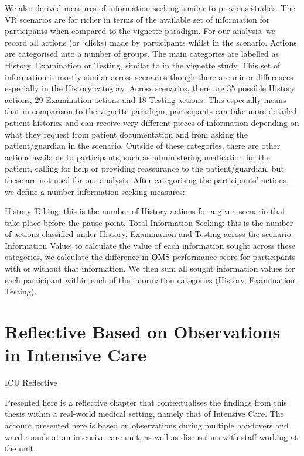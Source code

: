 \documentclass[a4paper, nobind]{templates/ociamthesis}
\begin{document}
We also derived measures of information seeking similar to previous studies. The VR scenarios are far richer in terms of the available set of information for participants when compared to the vignette paradigm. For our analysis, we record all actions (or `clicks) made by participants whilst in the scenario. Actions are categorised into a number of groups. The main categories are labelled as History, Examination or Testing, similar to in the vignette study. This set of information is mostly similar across scenarios though there are minor differences especially in the History category. Across scenarios, there are 35 possible History actions, 29 Examination actions and 18 Testing actions. This especially means that in comparison to the vignette paradigm, participants can take more detailed patient histories and can receive very different pieces of information depending on what they request from patient documentation and from asking the patient/guardian in the scenario. Outside of these categories, there are other actions available to participants, such as administering medication for the patient, calling for help or providing reassurance to the patient/guardian, but these are not used for our analysis. After categorising the participants' actions, we define a number information seeking measures:

History Taking: this is the number of History actions for a given scenario that take place before the pause point.
Total Information Seeking: this is the number of actions classified under History, Examination and Testing across the scenario.
Information Value: to calculate the value of each information sought across these categories, we calculate the difference in OMS performance score for participants with or without that information. We then sum all sought information values for each participant within each of the information categories (History, Examination, Testing).

\chapter*{Reflective Based on Observations in Intensive Care}\label{reflective-based-on-observations-in-intensive-care}

\adjustmtc
{}

ICU Reflective

Presented here is a reflective chapter that contextualises the findings from this thesis within a real-world medical setting, namely that of Intensive Care. The account presented here is based on observations during multiple handovers and ward rounds at an intensive care unit, as well as discussions with staff working at the unit.
\end{document}

